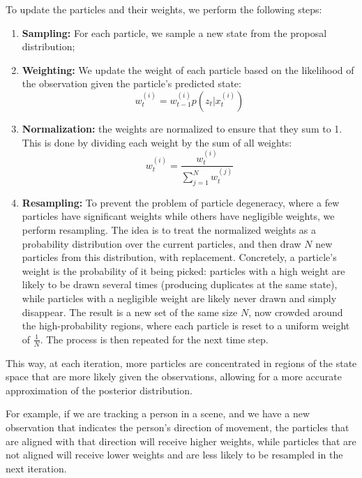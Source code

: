 To update the particles and their weights, we perform the following steps:
\begin{enumerate}
    \item \textbf{Sampling:} For each particle, we sample a new state from the proposal distribution;
    \item \textbf{Weighting:} We update the weight of each particle based on the likelihood of the observation given the particle's predicted state:
    $$w_t^{(i)} = w_{t-1}^{(i)} p(z_t | x_t^{(i) })$$
    \item \textbf{Normalization:} the weights are normalized to ensure that they sum to 1. This is done by dividing
    each weight by the sum of all weights:
    $$w_t^{(i)} = \frac{w_t^{(i)}}{\sum_{j=1}^N w_t^{(j)}}$$
    \item \textbf{Resampling:} To prevent the problem of particle degeneracy, where a few particles have significant weights while others have negligible weights, we perform resampling.
    The idea is to treat the normalized weights as a probability distribution over the current particles, and then draw $N$ new particles from this distribution, with replacement.
    Concretely, a particle's weight is the probability of it being picked: particles with a high weight are likely to be drawn several times (producing duplicates at the same state), while particles with a negligible weight are likely never drawn and simply disappear.
    The result is a new set of the same size $N$, now crowded around the high-probability regions, where each particle is reset to a uniform weight of $\frac{1}{N}$.
    The process is then repeated for the next time step.
\end{enumerate}
This way, at each iteration, more particles are concentrated in regions of the state space that are more likely given the observations, allowing for a more accurate approximation of the posterior distribution.

For example, if we are tracking a person in a scene, and we have a new observation that indicates the person's direction of movement, the particles
that are aligned with that direction will receive higher weights, while particles that are not aligned will receive lower weights and are less likely to be resampled in the next iteration.
